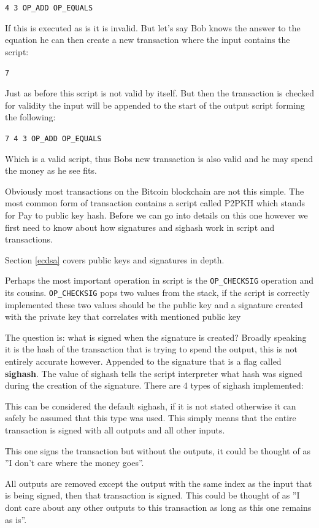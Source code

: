 \texttt{4 3 OP\_ADD OP\_EQUALS}

If this is executed as is it is invalid. But let's say Bob knows the answer to the equation he can then create a new transaction where the input contains the script: 

\texttt{7} 

Just as before this script is not valid by itself. But then the transaction is checked for validity the input will be appended to the start of the output script forming the following: 

\texttt{7 4 3 OP\_ADD OP\_EQUALS}

Which is a valid script, thus Bobs new transaction is also valid and he may spend the money as he see fits. 

Obviously most transactions on the Bitcoin blockchain are not this simple. The most common form of transaction contains a script called P2PKH which stands for Pay to public key hash. Before we can go into details on this one however we first need to know about how signatures and sighash work in script and transactions.

Section \ref{ecdsa} covers public keys and signatures in depth.

Perhaps the most important operation in script is the \texttt{OP\_CHECKSIG} operation and its cousins. \texttt{OP\_CHECKSIG} pops two values from the stack, if the script is correctly implemented these two values should be the public key and a signature created with the private key that correlates with mentioned public key

The question is: what is signed when the signature is created? Broadly speaking it is the hash of the transaction that is trying to spend the output, this is not entirely accurate however. Appended to the signature that is a flag called \textbf{sighash}. The value of sighash tells the script interpreter what hash was signed during the creation of the signature. There are 4 types of sighash implemented:

This can be considered the default sighash, if it is not stated otherwise it can safely be assumed that this type was used. This simply means that the entire transaction is signed with all outputs and all other inputs.


This one signs the transaction but without the outputs, it could be thought of as ''I don't care where the money goes''.

All outputs are removed except the output with the same index as the input that is being signed, then that transaction is signed.
This could be thought of as ''I dont care about any other outputs to this transaction as long as this one remains as is''.

